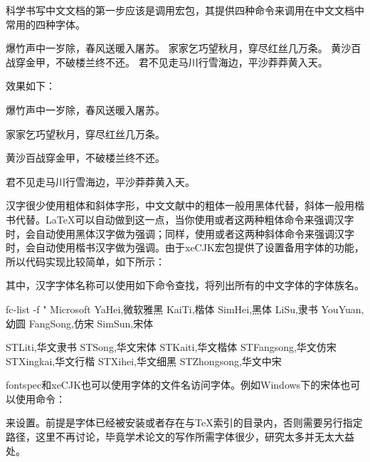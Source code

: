 科学书写中文文档的第一步应该是调用\CTeX 宏包，其提供四种命令来调用在中文文档中常用的四种字体。

\begin{latex}
{\songti 爆竹声中一岁除，春风送暖入屠苏。}
{\fangsong 家家乞巧望秋月，穿尽红丝几万条。}
{\heiti 黄沙百战穿金甲，不破楼兰终不还。}
{\kaishu 君不见走马川行雪海边，平沙莽莽黄入天。}
\end{latex}

效果如下：

\begin{center}
    {\songti 爆竹声中一岁除，春风送暖入屠苏。}\par
    {\fangsong 家家乞巧望秋月，穿尽红丝几万条。}\par
    {\heiti 黄沙百战穿金甲，不破楼兰终不还。}\par
    {\kaishu 君不见走马川行雪海边，平沙莽莽黄入天。}
\end{center}

汉字很少使用粗体和斜体字形，中文文献中的粗体一般用黑体代替，斜体一般用楷书代替。\LaTeX 可以自动做到这一点，当你使用或者这两种粗体命令来强调汉字时，会自动使用黑体汉字做为强调；同样，使用或者这两种斜体命令来强调汉字时，会自动使用楷书汉字做为强调。由于xeCJK宏包提供了设置备用字体的功能，所以代码实现比较简单，如下所示：

\begin{latex}
\end{latex}

其中，汉字字体名称可以使用如下命令查找，将列出所有的中文字体的字体族名。

\begin{latex}
fc-list -f "%
Microsoft YaHei,微软雅黑
KaiTi,楷体
SimHei,黑体
LiSu,隶书
YouYuan,幼圆
FangSong,仿宋
SimSun,宋体

STLiti,华文隶书
STSong,华文宋体
STKaiti,华文楷体
STFangsong,华文仿宋
STXingkai,华文行楷
STXihei,华文细黑
STZhongsong,华文中宋
\end{latex}

fontspec和xeCJK也可以使用字体的文件名访问字体。例如Windows下的宋体也可以使用命令：
\begin{latex}
\end{latex}
来设置。前提是字体已经被安装或者存在与\TeX 索引的目录内，否则需要另行指定路径，这里不再讨论，毕竟学术论文的写作所需字体很少，研究太多并无太大益处。


